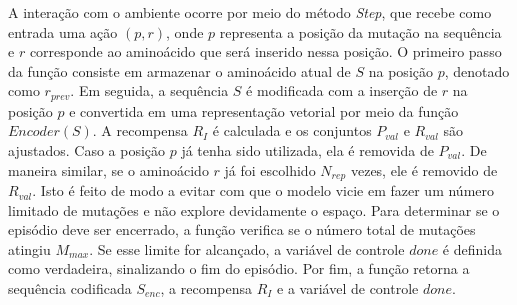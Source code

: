 A interação com o ambiente ocorre por meio do método \textit{Step},
que recebe como entrada uma ação $(p, r)$, onde $p$ representa a posição da mutação na sequência 
e $r$ corresponde ao aminoácido que será inserido nessa posição. 
O primeiro passo da função consiste em armazenar o aminoácido atual de $S$ na posição $p$, 
denotado como $r_{prev}$.
Em seguida, a sequência $S$ é modificada com a inserção de $r$ na posição $p$ 
e convertida em uma representação vetorial por meio da função $Encoder(S)$.
A recompensa $R_{I}$ é calculada e os conjuntos $P_{val}$ e $R_{val}$ são ajustados. 
Caso a posição $p$ já tenha sido utilizada, ela é removida de $P_{val}$.
De maneira similar, se o aminoácido $r$ já foi escolhido $N_{rep}$ vezes, 
ele é removido de $R_{val}$. Isto é feito de modo a evitar com que o modelo vicie em 
fazer um número limitado de mutações e não explore devidamente o espaço. 
Para determinar se o episódio deve ser encerrado,
a função verifica se o número total de mutações atingiu $M_{max}$. 
Se esse limite for alcançado, a variável de controle $done$ é definida como verdadeira,
sinalizando o fim do episódio. Por fim, a função retorna a sequência codificada $S_{enc}$, a recompensa $R_{I}$ 
e a variável de controle $done$.


